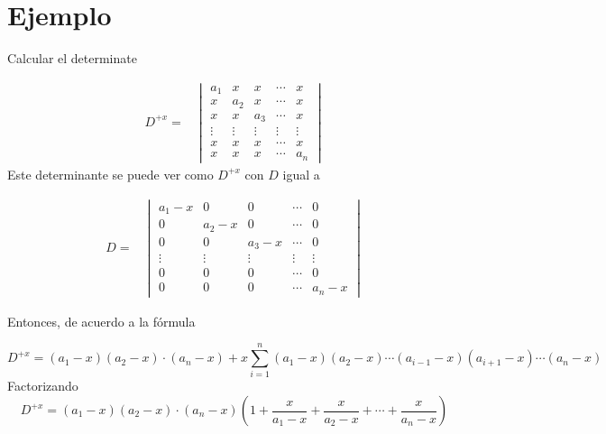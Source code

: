 \documentclass[
]{article}
\begin{document}
\hypertarget{ejemplo-10}{%
\section{Ejemplo}\label{ejemplo-10}}

Calcular el determinate

\begin{equation*}
\begin{array}{cc}
D^{+x} = &  \begin{vmatrix} 
          a_{1}    & x     & x      & \cdots     & x      \\ 
          x        & a_{2} & x      & \cdots     & x      \\
          x        & x     & a_{3}  &  \cdots    & x      \\
          \vdots   & \vdots& \vdots & \vdots     & \vdots \\
          x        & x     & x      & \cdots     & x      \\
          x        & x     & x      & \cdots     & a_{n}
  \end{vmatrix}
\end{array}
\end{equation*} Este determinante se puede ver como \(D^{+x}\) con \(D\)
igual a

\begin{equation*}
\begin{array}{cc}
D = &  \begin{vmatrix} 
          a_{1}-x     & 0       & 0         & \cdots     & 0      \\ 
          0           & a_{2}-x & 0         & \cdots     & 0      \\
          0           & 0       & a_{3}-x   &  \cdots    & 0      \\
          \vdots      & \vdots  & \vdots    & \vdots     & \vdots \\
          0           & 0       & 0         & \cdots     & 0      \\
          0           & 0       & 0         & \cdots     & a_{n}-x
  \end{vmatrix}
\end{array}
\end{equation*}

Entonces, de acuerdo a la fórmula

\begin{equation*}
  D^{+x} = (a_1-x)(a_2-x)\cdot(a_n-x) + x\sum_{i=1}^{n}(a_1-x)(a_2-x)\cdots(a_{i-1}-x)(a_{i+1}-x)\cdots(a_n-x)
\end{equation*} Factorizando \begin{equation*}
  D^{+x} = (a_1-x)(a_2-x)\cdot(a_n-x)(1+\frac{x}{a_1-x}+\frac{x}{a_2-x}+\cdots+\frac{x}{a_n-x}) 
\end{equation*}
\end{document}
